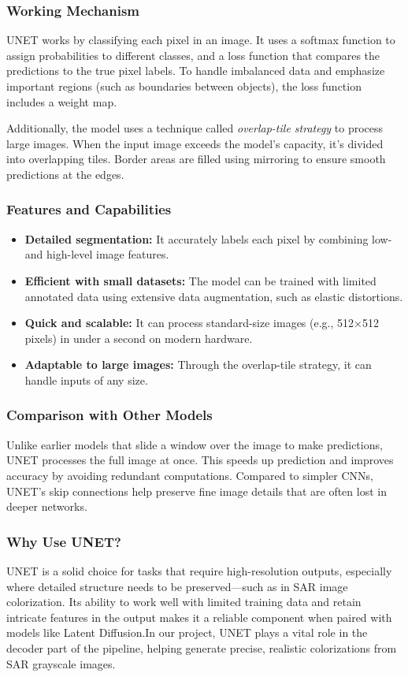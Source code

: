 \subsubsection{Working Mechanism}
UNET works by classifying each pixel in an image. It uses a softmax function \cite{ronneberger2015unetconvolutionalnetworksbiomedical} to assign probabilities to different classes, and a loss function that compares the predictions to the true pixel labels. To handle imbalanced data and emphasize important regions (such as boundaries between objects), the loss function includes a weight map.

Additionally, the model uses a technique called \textit{overlap-tile strategy} to process large images. When the input image exceeds the model's capacity, it's divided into overlapping tiles. Border areas are filled using mirroring to ensure smooth predictions at the edges.

\subsubsection{Features and Capabilities}
\begin{itemize}
    \item \textbf{Detailed segmentation:} It accurately labels each pixel by combining low- and high-level image features.
    \item \textbf{Efficient with small datasets:} The model can be trained with limited annotated data using extensive data augmentation, such as elastic distortions.
    \item \textbf{Quick and scalable:} It can process standard-size images (e.g., 512×512 pixels) in under a second on modern hardware.
    \item \textbf{Adaptable to large images:} Through the overlap-tile strategy, it can handle inputs of any size.
\end{itemize}

\subsubsection{Comparison with Other Models}
Unlike earlier models that slide a window over the image to make predictions, UNET processes the full image at once. This speeds up prediction and improves accuracy by avoiding redundant computations. Compared to simpler CNNs, UNET’s skip connections help preserve fine image details that are often lost in deeper networks.

\subsubsection{Why Use UNET?}
UNET is a solid choice for tasks that require high-resolution outputs, especially where detailed structure needs to be preserved—such as in SAR image colorization. Its ability to work well with limited training data and retain intricate features in the output makes it a reliable component when paired with models like Latent Diffusion.In our project, UNET plays a vital role in the decoder part of the pipeline, helping generate precise, realistic colorizations from SAR grayscale images.


